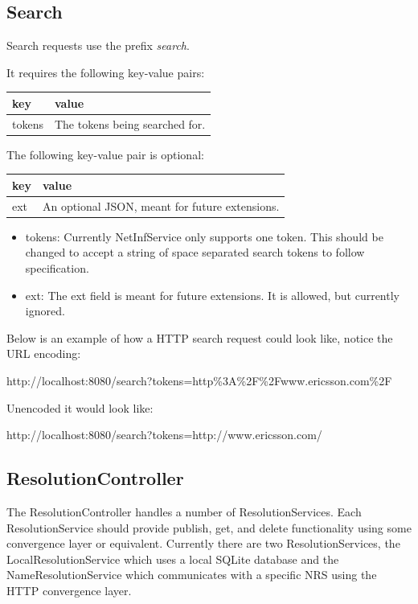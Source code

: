 \subsection{Search}

Search requests use the prefix \emph{search}.

It requires the following key-value pairs:

\begin{tabular}{ | l | l | }
	\hline
	key & value  \\ \hline \hline
	tokens & The tokens being searched for.  \\ \hline
\end{tabular}

The following key-value pair is optional:

\begin{tabular}{ | l | l | }
	\hline
	key & value  \\ \hline \hline
	ext & An optional JSON, meant for future extensions. \\ \hline
\end{tabular}

\begin{itemize}
	\item tokens: Currently NetInfService only supports one token. This should be changed to accept a string of space separated search tokens to follow specification.
	\item ext: The ext field is meant for future extensions. It is allowed, but currently ignored.
 \end{itemize}

Below is an example of how a HTTP search request could look like, notice the URL encoding:

http://localhost:8080/search?tokens=http\%3A\%2F\%2Fwww.ericsson.com\%2F

Unencoded it would look like:

http://localhost:8080/search?tokens=http://www.ericsson.com/

\subsection{ResolutionController}
\label{sec:ResolutionController}

The ResolutionController handles a number of ResolutionServices. Each ResolutionService should provide publish, get, and delete functionality using some convergence layer or equivalent. Currently there are two ResolutionServices, the LocalResolutionService which uses a local SQLite database and the NameResolutionService which communicates with a specific NRS using the HTTP convergence layer.


